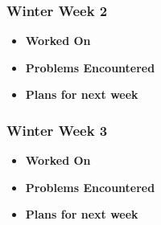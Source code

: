\documentclass[compsoc,draftclsnofoot,onecolumn,10pt]{IEEEtran}
\begin{document}
\subsubsection{Winter Week 2}
\begin{itemize}
    \item {\textbf{Worked On}}
    \begin{itemize}
        
    \end{itemize}

    \item {\textbf{Problems Encountered}}
    \begin{itemize}
        
    \end{itemize}

    \item{\textbf{Plans for next week}}
    \begin{itemize}
        
    \end{itemize}

\end{itemize}

\subsubsection{Winter Week 3}
\begin{itemize}
    \item {\textbf{Worked On}}
    \begin{itemize}
        
    \end{itemize}

    \item {\textbf{Problems Encountered}}
    \begin{itemize}
        
    \end{itemize}

    \item{\textbf{Plans for next week}}
    \begin{itemize}
        
    \end{itemize}

\end{itemize}
\end{document}

